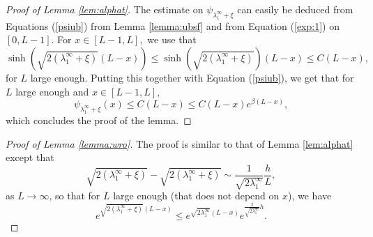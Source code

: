 \documentclass[11pt]{article}
\theoremstyle{plain}
\newcommand\linf{\lambda_1^\infty}
\begin{document}
\begin{appendix}
\begin{proof}[Proof of Lemma \ref{lem:alphat}]
\bigskip

 The estimate on $\psi_{\linf+\xi}$ can easily be  deduced from Equations (\ref{psiub}) from Lemma \ref{lemma:ubsf} and  from Equation (\ref{exp:1}) on $[0,L-1]$. For $x\in[L-1,L],$ we use that 
$$\sinh\left(\sqrt{2{(\linf+\xi)}}(L-x)\right)\leqslant \sinh\left(\sqrt{2{(\linf+\xi)}}\right)(L-x)\leqslant C(L-x),$$ for $L$ large enough. Putting this together with Equation (\ref{psiub}), we get  that for $L$ large enough and $x\in[L-1,L]$,
\begin{equation*}
\psi_{\linf+\xi}(x)\leqslant C(L-x) \leqslant C(L-x)e^{\beta(L-x)},
\end{equation*}
which concludes the proof of the lemma.
\end{proof}

\begin{proof}[Proof of Lemma \ref{lemma:wro}]
  The proof is similar to that of Lemma \ref{lem:alphat}
except that 
 $$\sqrt{2(\linf+\xi)}-\sqrt{2(\linf+\xi)}\sim\frac{1}{\sqrt{2\linf}}\frac{h}{L},$$ as $L\to\infty$, so that for $L$ large enough (that does not depend on $x$), we have 
\begin{equation*}
e^{\sqrt{2(\linf+\xi)}(L-x)}\leqslant e^{\sqrt{2\linf}(L-x)}e^{\frac{2}{\sqrt{2\linf}}h}.
\end{equation*}
\end{proof}


\end{appendix}
\end{document}
